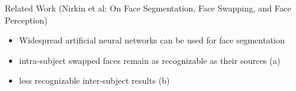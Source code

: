 \documentclass{beamer}
\begin{document}
\begin{frame}[c]{Related Work (Nirkin et al: On Face Segmentation, Face Swapping, and Face Perception)}
	\begin{itemize}
		\item Widespread artificial neural networks can be used for  face segmentation
		\item intra-subject swapped faces remain as recognizable as their sources (a)
		\item less recognizable inter-subject results (b)
	\end{itemize}
	\begin{figure}
		\centering
		\quad
	\end{figure}
\end{frame}

\backupend
\end{document}
